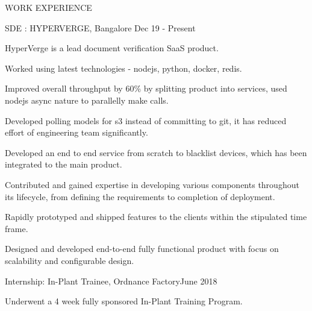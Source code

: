 \documentclass{resume} %
\begin{document}
\begin{rSection}{ WORK EXPERIENCE }

\begin{rSubsection}{ SDE : HYPERVERGE, Bangalore} {Dec 19 - Present}{}

\item  HyperVerge is a lead document verification SaaS product.
\item Worked using latest technologies - nodejs, python, docker, redis.
\item Improved overall throughput by 60\% by splitting product into services, used nodejs async nature to parallelly make calls.
\item Developed polling models for s3 instead of committing to git, it has reduced effort of engineering team significantly.
\item Developed an end to end service from scratch to blacklist devices, which has been integrated to the main product.
\item Contributed and gained expertise in developing various components throughout its lifecycle, from defining the requirements to completion of deployment.
\item Rapidly prototyped and shipped features to the clients within the stipulated time frame.
\item Designed and developed end-to-end fully functional product with focus on scalability and configurable design.

\end{rSubsection}


\begin{rSubsection}{ Internship: In-Plant Trainee, Ordnance Factory}{June 2018}{}

\item Underwent a 4 week fully sponsored In-Plant Training Program.

\end{rSubsection}

\end{rSection}
\end{document}
